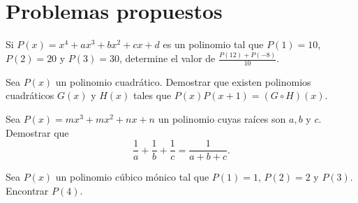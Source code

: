 \section{Problemas propuestos}

\begin{section-problem}
    Si $P(x) = x^4 + ax^3 + bx^2 + cx + d$ es un polinomio tal que $P(1) = 10$, $P(2) = 20$ y $P(3) = 30$, determine el valor de $\frac{P(12) + P(-8)}{10}.$
\end{section-problem}

\begin{section-problem}
    Sea $P(x)$ un polinomio cuadrático. Demostrar que existen polinomios cuadráticos $G(x)$ y $H(x)$ tales que $P(x)P(x+1) = (G \circ H)(x).$
\end{section-problem}

\begin{section-problem}
    Sea $P(x) = mx^3 + mx^2 + nx + n$ un polinomio cuyas raíces son $a, b \mbox{ y } c$. Demostrar que
    \[\frac{1}{a} + \frac{1}{b} + \frac{1}{c} = \frac{1}{a + b + c}.\]
\end{section-problem}

\begin{section-problem}
    Sea $P(x)$ un polinomio cúbico mónico tal que $P(1) = 1$, $P(2) = 2$ y $P(3)$. Encontrar $P(4).$
\end{section-problem}